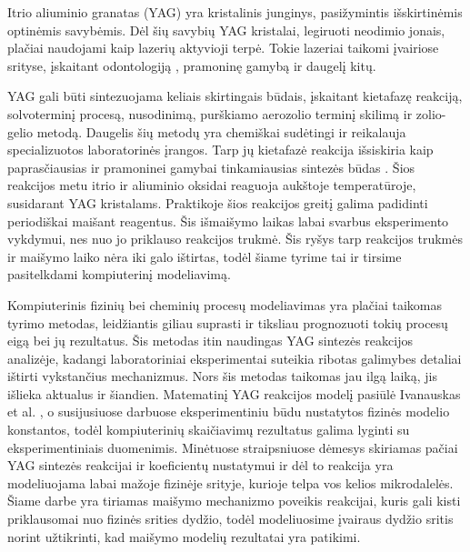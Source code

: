 
Itrio aliuminio granatas (YAG) yra kristalinis junginys, pasižymintis išskirtinėmis optinėmis savybėmis. Dėl šių savybių YAG kristalai, legiruoti neodimio jonais, plačiai naudojami kaip lazerių aktyvioji terpė. Tokie lazeriai taikomi įvairiose srityse, įskaitant odontologiją \cite{valentiUseErYAG2021}, pramoninę gamybą \cite{dubeyExperimentalStudyNd2008} ir daugelį kitų.

YAG gali būti sintezuojama keliais skirtingais būdais, įskaitant kietafazę reakciją, solvoterminį procesą, nusodinimą, purškiamo aerozolio terminį skilimą ir zolio-gelio metodą. Daugelis šių metodų yra chemiškai sudėtingi ir reikalauja specializuotos laboratorinės įrangos. Tarp jų kietafazė reakcija išsiskiria kaip paprasčiausias ir pramoninei gamybai tinkamiausias sintezės būdas \cite{zhangNovelSynthesisYAG2005}. Šios reakcijos metu itrio ir aliuminio oksidai reaguoja aukštoje temperatūroje, susidarant YAG kristalams. Praktikoje šios reakcijos greitį galima padidinti periodiškai maišant reagentus. Šis išmaišymo laikas labai svarbus eksperimento vykdymui, nes nuo jo priklauso reakcijos trukmė. Šis ryšys tarp reakcijos trukmės ir maišymo laiko nėra iki galo ištirtas, todėl šiame tyrime tai ir tirsime pasitelkdami kompiuterinį modeliavimą.

Kompiuterinis fizinių bei cheminių procesų modeliavimas yra plačiai taikomas tyrimo metodas, leidžiantis giliau suprasti ir tiksliau prognozuoti tokių procesų eigą bei jų rezultatus. Šis metodas itin naudingas YAG sintezės reakcijos analizėje, kadangi laboratoriniai eksperimentai suteikia ribotas galimybes detaliai ištirti vykstančius mechanizmus. Nors šis metodas taikomas jau ilgą laiką, jis išlieka aktualus ir šiandien. Matematinį YAG reakcijos modelį pasiūlė Ivanauskas et al. \cite{ivanauskasModellingSolidState2005}, o susijusiuose darbuose \cite{ivanauskasComputationalModellingYAG2009,mackeviciusCloserLookComputer2012} eksperimentiniu būdu nustatytos fizinės modelio konstantos, todėl kompiuterinių skaičiavimų rezultatus galima lyginti su eksperimentiniais duomenimis. Minėtuose straipsniuose dėmesys skiriamas pačiai YAG sintezės reakcijai ir koeficientų nustatymui ir dėl to reakcija yra modeliuojama labai mažoje fizinėje srityje, kurioje telpa vos kelios mikrodalelės. Šiame darbe yra tiriamas maišymo mechanizmo poveikis reakcijai, kuris gali kisti priklausomai nuo fizinės srities dydžio, todėl modeliuosime įvairaus dydžio sritis norint užtikrinti, kad maišymo modelių rezultatai yra patikimi.

